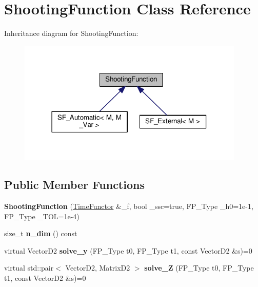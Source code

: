 \hypertarget{classShootingFunction}{}\section{Shooting\+Function Class Reference}
\label{classShootingFunction}


Inheritance diagram for Shooting\+Function\+:
\nopagebreak
\begin{figure}[H]
\begin{center}
\leavevmode
\includegraphics[width=306pt]{classShootingFunction__inherit__graph}
\end{center}
\end{figure}
\subsection*{Public Member Functions}
\begin{DoxyCompactItemize}
\item 
\mbox{\label{classShootingFunction_a84f50a64e417a35a9a9c3dc561fbb9a9}} 
{\bfseries Shooting\+Function} (\hyperlink{classTimeFunctor}{Time\+Functor} \&\+\_\+f, bool \+\_\+ssc=true, F\+P\+\_\+\+Type \+\_\+h0=1e-\/1, F\+P\+\_\+\+Type \+\_\+\+T\+O\+L=1e-\/4)
\item 
\mbox{\label{classShootingFunction_a39e6d5052e9d73ca3f5d4986752525aa}} 
size\+\_\+t {\bfseries n\+\_\+dim} () const
\item 
\mbox{\label{classShootingFunction_acb29074b32316fdd368d71a775983f81}} 
virtual Vector\+D2 {\bfseries solve\+\_\+y} (F\+P\+\_\+\+Type t0, F\+P\+\_\+\+Type t1, const Vector\+D2 \&s)=0
\item 
\mbox{\label{classShootingFunction_a41360056996ee70c43c4538acd6e28d8}} 
virtual std\+::pair$<$ Vector\+D2, Matrix\+D2 $>$ {\bfseries solve\+\_\+Z} (F\+P\+\_\+\+Type t0, F\+P\+\_\+\+Type t1, const Vector\+D2 \&s)=0
\end{DoxyCompactItemize}
